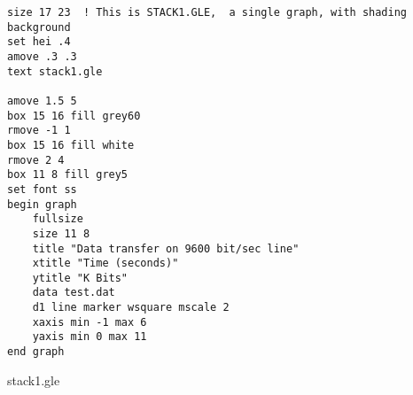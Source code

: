 \clearpage
\begin{center}
\begin{minipage}[t]{12.0cm}
{\scriptsize %
\begin{verbatim}
size 17 23 	! This is STACK1.GLE,  a single graph, with shading background
set hei .4
amove .3 .3
text stack1.gle

amove 1.5 5
box 15 16 fill grey60
rmove -1 1
box 15 16 fill white
rmove 2 4
box 11 8 fill grey5
set font ss
begin graph
	fullsize
	size 11 8
	title "Data transfer on 9600 bit/sec line"
	xtitle "Time (seconds)"
	ytitle "K Bits"
	data test.dat
	d1 line marker wsquare mscale 2
	xaxis min -1 max 6
	yaxis min 0 max 11
end graph

\end{verbatim}
}
\hfill {\small stack1.gle}\\
\end{minipage}

\end{center}
\vfill
